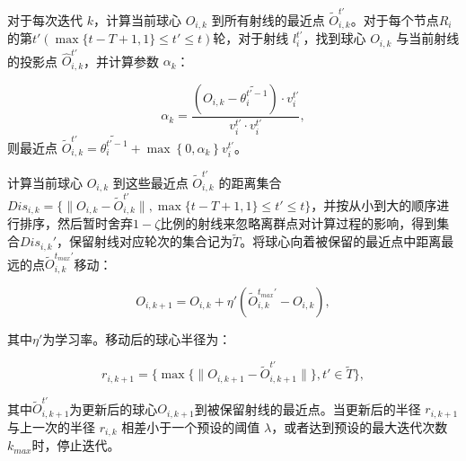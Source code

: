 \documentclass[lettersize,journal]{IEEEtran}
\begin{document}
\begin{enumerate}
对于每次迭代 \( k \)，计算当前球心 \( O_{i,k} \) 到所有射线的最近点 \( \tilde{O}_{i,k}^{t'} \)。对于每个节点$R_i$的第$t'(\max\{t-T+1, 1\}\leq  t'\leq t)$轮，对于射线 \( l_i^{t'} \)，找到球心 \( O_{i,k} \) 与当前射线的投影点 \( \hat O_{i,k}^{t'} \)，并计算参数 \( \alpha_k \)：


    \begin{equation}
    \alpha_k = \frac{(O_{i,k} - \widetilde{\theta_{i}^{t'-1}}) \cdot {v}_{i}^{t'}}{{v}_{i}^{t'}\cdot {v}_{i}^{t'}},
    \end{equation}
    则最近点 \( \tilde O_{i,k}^{t'} =\widetilde{\theta_{i}^{t'-1}}+\max \left\{ 0, \alpha_k\right\} {v}_{i}^{t'} \)。
    
    计算当前球心 \( O_{i,k} \) 到这些最近点 \( \tilde O_{i,k}^{t'} \) 的距离集合 \( Dis_{i,k}= \{ \| O_{i,k}-\tilde O_{i,k}^{t'} \|, \max\{t-T+1, 1\}\leq  t'\leq t\} \)，并按从小到大的顺序进行排序，然后暂时舍弃$1-\zeta$比例的射线来忽略离群点对计算过程的影响，得到集合${Dis}_{i,k}'$，保留射线对应轮次的集合记为$\tilde T$。将球心向着被保留的最近点中距离最远的点$\tilde{O}_{i,k}^{t_{max}'}$移动：


    \begin{equation}
    O_{i,k+1} = O_{i,k} + \eta' (\tilde{O}_{i,k}^{t_{max}'}-O_{i,k}),
    \end{equation}

    其中$\eta'$为学习率。移动后的球心半径为：

        \begin{equation}
        r_{i,k+1} =  \{ \max\{\| O_{i,k+1}-\tilde O_{i,k+1}^{t'} \|\}, t'\in \tilde T\} ,
        \end{equation}

    其中$\tilde O_{i,k+1}^{t'}$为更新后的球心$O_{i,k+1}$到被保留射线的最近点。当更新后的半径 \( r_{i,k+1} \) 与上一次的半径 \( r_{i,k} \) 相差小于一个预设的阈值 \( \lambda \)，或者达到预设的最大迭代次数$k_{max}$时，停止迭代。


\end{enumerate}
\end{document}
